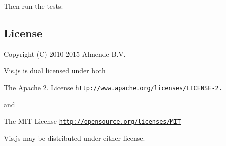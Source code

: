 Then run the tests\+: 


\subsection*{License}

Copyright (C) 2010-\/2015 Almende B.\+V.

Vis.\+js is dual licensed under both


\begin{DoxyItemize}
\item The Apache 2. License \href{http://www.apache.org/licenses/LICENSE-2.0}{\tt http\+://www.\+apache.\+org/licenses/\+L\+I\+C\+E\+N\+S\+E-\/2.}
\end{DoxyItemize}

and


\begin{DoxyItemize}
\item The M\+IT License \href{http://opensource.org/licenses/MIT}{\tt http\+://opensource.\+org/licenses/\+M\+IT}
\end{DoxyItemize}

Vis.\+js may be distributed under either license. 